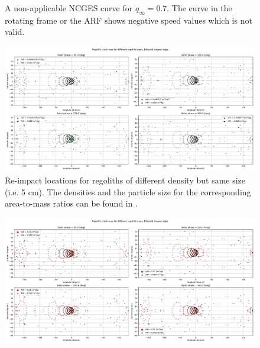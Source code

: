\documentclass[print]{tudelft-report}
\begin{document}
\begin{appendices}
\begin{figure}[htb]
    \caption{A non-applicable \gls{NCGES} curve for $q_\infty=0.7$. The curve in the rotating frame or the \gls{ARF} shows negative speed values which is not valid.}
    \label{fig:non_conservative_qinfinity_0.7}
    \end{figure}
    \FloatBarrier
    \begin{figure}[htb]
    \centering
    \captionsetup{justification=centering}
    \includegraphics[angle=90, width=\textwidth, height=\textheight, keepaspectratio=true]{Results/Images/longest_edge_perturbations/multiple_regolith_types/allPhases_crashMap_3P2_7P5_density_5cm_Radius.pdf}
    \caption{Re-impact locations for regoliths of different density but same size (i.e. 5 cm). The densities and the particle size for the corresponding area-to-mass ratios can be found in .}
    \label{fig:crashmap_3.2_7.5_density_5cmRadius}
    \end{figure}
    \FloatBarrier
    \begin{figure}[htb]
    \centering
    \captionsetup{justification=centering}
    \includegraphics[angle=90, width=\textwidth, height=\textheight, keepaspectratio=true]{Results/Images/longest_edge_perturbations/multiple_regolith_types/allPhases_crashMap_7P5_density_1cm_5cm_Radius.pdf}

\end{figure}
\end{appendices}
\end{document}
